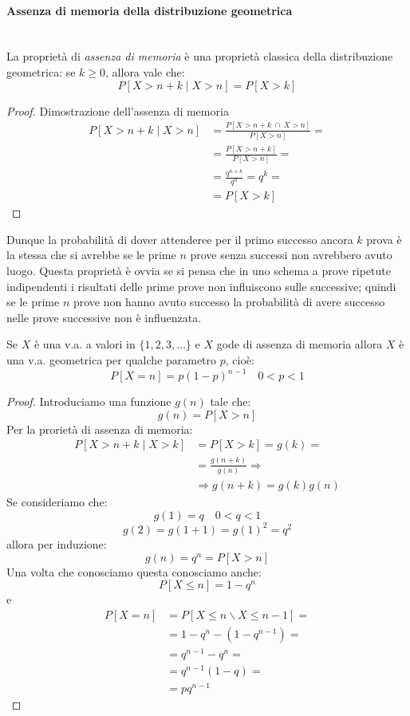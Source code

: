 \documentclass[12pt]{report}
\newcounter{theorem}
\begin{document}
  	 	\paragraph{Assenza di memoria della distribuzione geometrica} \quad \\
  	 	La proprietà di \textit{assenza di memoria} è una proprietà classica della distribuzione geometrica: se $k \geq 0$, allora vale che:
  	 	\[
  	 	P[X>n+k\mid X>n] = P[X>k]
  	 	\]
  	 	\begin{proof}{Dimostrazione dell'assenza di memoria} \quad \\
  	 		\begin{align*}
  	 		P[X>n+k\mid X>n] &= \frac{P[X>n+k\ \cap\ X>n]}{P[X>n]} = \\ &= \frac{P[X>n+k]}{P[X>n]} = \\ &= \frac{q^{n+k}}{q^n} = q^k = \\ &= P[X>k]
  	 		\end{align*}
  	 	\end{proof}
  	 	Dunque la probabilità di dover attenderee per il primo successo ancora $k$ prova è la stessa che si avrebbe se le prime $n$ prove senza successi non avrebbero avuto luogo. Questa proprietà è ovvia se si pensa che in uno schema a prove ripetute indipendenti i risultati delle prime prove non influiscono sulle successive; quindi se le prime $n$ prove non hanno avuto successo la probabilità di avere successo nelle prove successive non è influenzata.
  	 	\begin{theorem}{}{}
  	 		Se $X$ è una v.a. a valori in $\{1, 2, 3, \dots\}$ e $X$ gode di assenza di memoria allora $X$ è una v.a. geometrica per qualche parametro $p$, cioè:
  	 		\[
  	 		P[X=n] = p(1-p)^{n-1} \quad 0 < p < 1
  	 		\]
  			\begin{proof}
  				Introduciamo una funzione $g(n)$ tale che:
  				\[
  				g(n) = P[X>n]
  				\]
  				Per la prorietà di assenza di memoria:
  				\begin{align*}
  				P[X>n+k \mid X>k] &= P[X>k] = g(k) = \\ &= \frac{g(n+k)}{g(n)} \Rightarrow \\ &\Rightarrow g(n+k)=g(k)g(n)
  				\end{align*}
  				Se consideriamo che:
  				\[
  				g(1) = q \quad 0 < q < 1
  				\]
  				\[
  				g(2) = g(1+1)=g(1)^2 = q^2
  				\]
  				allora per induzione:
  				\[
  				g(n) = q^n = P[X>n]
  				\]
  				Una volta che conosciamo questa conosciamo anche:
  				\[
  				P[X\leq n] = 1 - q^n
  				\]
  				e
  				\begin{align*}
  				P[X = n] &= P[X \leq n \backslash X \leq n-1] = \\ &= 1 - q^n - (1 - q^{n-1}) = \\ &= q^{n-1} - q^n = \\ &= q^{n-1}(1-q)= \\ &= pq^{n-1}
  				\end{align*}
  			\end{proof}
  	 	\end{theorem}
\end{document}
